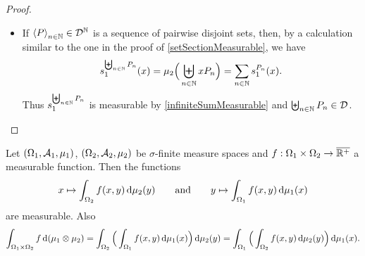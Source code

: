 \begin{proof}
\begin{itemize}
Now similarly fix some monotone sequence $\seq{C_n}_{n\in\N}$ in $\mathcal{A}_1$ of finite measure whose union is $\Omega_1$. TODO finish proof!!

\item If $\left\langle P \right\rangle_{n\in\mathbb{N}}\in\mathcal{D}^{\mathbb{N}}$ is a sequence of pairwise disjoint sets, then, by a calculation similar to the one in the proof of \ref{setSectionMeasurable}, we have
\[ s_1^{\biguplus_{n\in\mathbb{N}}P_n}(x) = \mu_2\Big(\biguplus_{n\in\mathbb{N}}xP_n\Big) = \sum_{n\in\mathbb{N}}s_1^{P_n}(x). \]
Thus $s_1^{\biguplus_{n\in\mathbb{N}}P_n}$ is measurable by \ref{infiniteSumMeasurable} and $\biguplus_{n\in\mathbb{N}}P_n\in\mathcal{D}$.
\end{itemize}
\end{proof}

\begin{theorem} \label{tonellisTheorem}
Let $\sSet{\Omega_1, \mathcal{A}_1, \mu_1}$, $\sSet{\Omega_2, \mathcal{A}_2, \mu_2}$ be $\sigma$-finite measure spaces and $f: \Omega_1\times\Omega_2 \to \overline{\mathbb{R}^+}$ a measurable function. Then the functions
\[ x\mapsto \int_{\Omega_2}f(x,y)\operatorname{d \!}{\mu_2(y)} \qquad\text{and}\qquad y\mapsto \int_{\Omega_1}f(x,y)\operatorname{d \!}{\mu_1(x)} \]
are measurable. Also
\[ \int_{\Omega_1\times\Omega_2}f\operatorname{d \!}{(\mu_1\otimes\mu_2)} = \int_{\Omega_2}\Big(\int_{\Omega_1}f(x,y)\operatorname{d \!}{\mu_1(x)}\Big)\operatorname{d \!}{\mu_2(y)} = \int_{\Omega_1}\Big(\int_{\Omega_2}f(x,y)\operatorname{d \!}{\mu_2(y)}\Big)\operatorname{d \!}{\mu_1(x)}. \]
\end{theorem}
